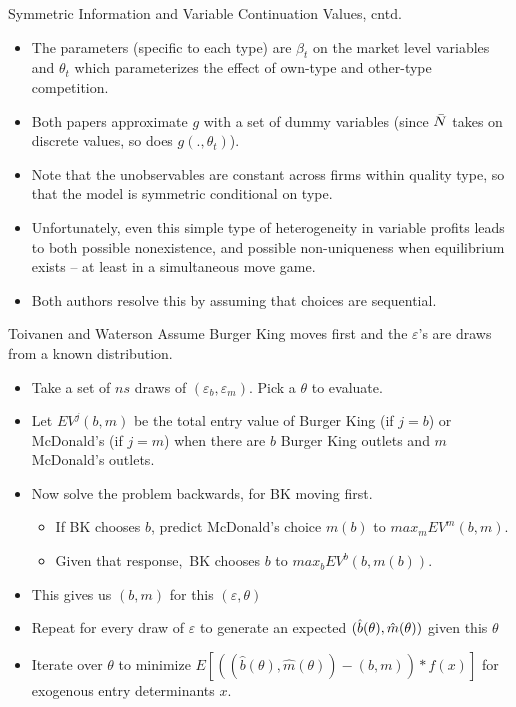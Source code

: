 \begin{frame}{Symmetric Information and Variable Continuation Values,
cntd.}
\begin{itemize}
\item The parameters (specific to each type) are $\beta _{t}$ on the market
level variables and $\theta _{t}$ which parameterizes the effect of own-type
and other-type competition.
\item Both papers approximate $g$ with a set of dummy variables (since $\bar{%
N}$ takes on discrete values, so does $g(.,\theta _{t})$).
\item Note that the unobservables are constant across firms within quality
type, so that the model is symmetric conditional on type.
\item Unfortunately, even this simple type of heterogeneity in variable
profits leads to both possible nonexistence, and possible non-uniqueness
when equilibrium exists -- at least in a simultaneous move game.
\item Both authors resolve this by assuming that choices are sequential.
\end{itemize}
\end{frame}


\begin{frame}{Toivanen and Waterson}
Assume Burger King moves first and the $\varepsilon $'s are draws from a
known distribution.
\begin{itemize}
\item Take a set of $ns$ draws of $(\varepsilon _{b},\varepsilon _{m})$.
Pick a $\theta $ to evaluate.
\item Let $EV^{j}(b,m)$ be the total entry value of Burger King (if $j=b$)
or McDonald's (if $j=m$) when there are $b$ Burger King outlets and $m$
McDonald's outlets.
\item Now solve the problem backwards, for BK moving first.
\begin{itemize}
\item If BK chooses $b$, predict McDonald's choice $m(b)$ to $%
max_{m}EV^{m}(b,m)$.
\item Given that response,\ BK chooses $b$ to $max_{b}EV^{b}(b,m(b))$.
\end{itemize}
\item This gives us $(b,m)$ for this $(\varepsilon ,\theta )$
\item Repeat for every draw of $\varepsilon $ to generate an expected $(\hat{%
b}(\theta ),\hat{m}(\theta ))$ given this $\theta $
\item Iterate over $\theta $ to minimize $E[((\hat{b}(\theta ),\hat{m}%
(\theta ))-(b,m))\ast f(x)]$ for exogenous entry determinants $x$.
\end{itemize}
\end{frame}


